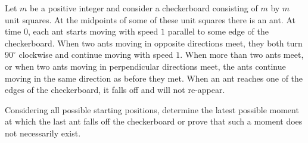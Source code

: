 Let $m$ be a positive integer and consider a checkerboard consisting of $m$ by $m$ unit squares. At the midpoints of some of these unit squares there is an ant. At time $0$, each ant starts moving with speed $1$ parallel to some edge of the checkerboard. When two ants moving in opposite directions meet, they both turn $90^{\circ}$ clockwise and continue moving with speed $1$. When more than two ants meet, or when two ants moving in perpendicular directions meet, the ants continue moving in the same direction as before they met. When an ant reaches one of the edges of the checkerboard, it falls off and will not re-appear.

Considering all possible starting positions, determine the latest possible moment at which the last ant falls off the checkerboard or prove that such a moment does not necessarily exist.
